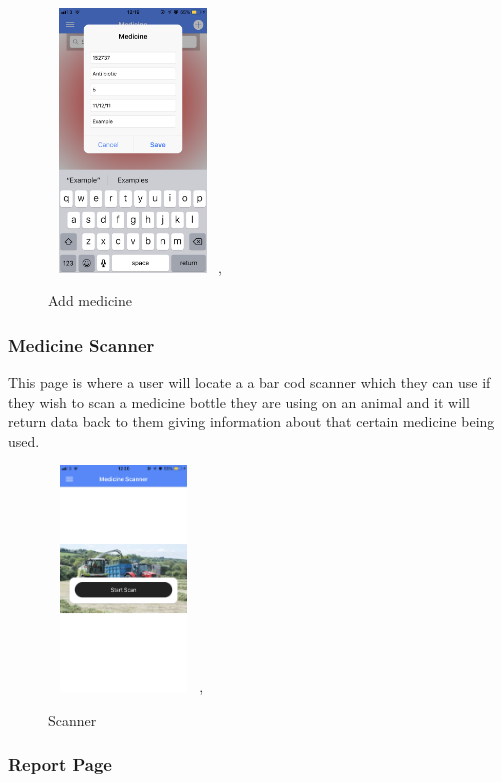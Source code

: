 \documentclass[12pt,a4paper,oneside,openany]{book}
\begin{document}
\begin{figure}[ht]
\renewcommand\thefigure{5.17}
\centering
\includegraphics[width=4.5cm,height=7cm]{Images/addMed.png},
\caption{Add medicine}
\label{add Med}
\end{figure}

\newpage

\subsubsection{Medicine Scanner}
This page is where a user will locate a a bar cod scanner which they can use if they wish to scan a medicine bottle they are using on an animal and it will return data back to them giving information about that certain medicine being used.

\begin{figure}[ht]
\renewcommand\thefigure{5.18}
\centering
\includegraphics[width=4cm,height=6cm]{Images/scan1.png},
\caption{Scanner}
\label{feed}
\end{figure}

\subsubsection{Report Page}

\end{document}
